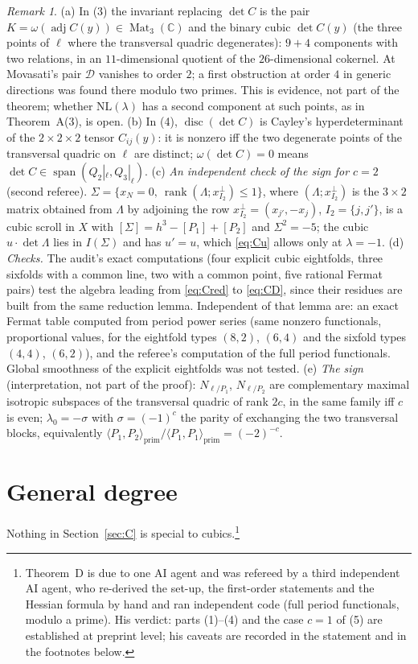 \documentclass[10pt]{article}
\numberwithin{equation}{section}
\theoremstyle{remark}
\newtheorem{remark}[theorem]{Remark}
\newcommand{\CC}{\mathbb{C}}
\newcommand{\NL}{\mathrm{NL}}
\newcommand{\cD}{\mathcal{D}}
\newcommand{\adj}{\operatorname{adj}}
\begin{document}
\begin{remark}\label{rem:C}
(a) In (3) the invariant replacing $\det C$ is the pair $K=\omega(\adj C(y))\in\operatorname{Mat}_3(\CC)$ and
the binary cubic $\det C(y)$ (the three points of $\ell$ where the transversal quadric degenerates): $9+4$
components with two relations, in an $11$-dimensional quotient of the $26$-dimensional cokernel. At Movasati's
pair $\cD$ vanishes to order $2$; a first obstruction at order $4$ in generic directions was found there modulo
two primes. This is evidence, not part of the theorem; whether $\NL(\lambda)$ has a second component at such
points, as in Theorem~A(3), is open.
(b) In (4), $\operatorname{disc}(\det C)$ is Cayley's hyperdeterminant of the $2\times2\times2$ tensor
$C_{ij}(y)$: it is nonzero iff the two degenerate points of the transversal quadric on $\ell$ are distinct;
$\omega(\det C)=0$ means $\det C\in\operatorname{span}(Q_2|_\ell,Q_3|_\ell)$.
(c) \emph{An independent check of the sign for $c=2$} (second referee). $\Sigma=\{x_N=0,\ \operatorname{rank}
(\Lambda;x_{I_2}^{\perp})\le1\}$, where $(\Lambda;x_{I_2}^{\perp})$ is the $3\times2$ matrix obtained from
$\Lambda$ by adjoining the row $x_{I_2}^{\perp}=(x_{j'},-x_j)$, $I_2=\{j,j'\}$, is a cubic scroll in $X$ with $[\Sigma]=h^3-[P_1]+[P_2]$ and $\Sigma^2=-5$; the
cubic $u\cdot\det\Lambda$ lies in $I(\Sigma)$ and has $u'=u$, which \eqref{eq:Cu} allows only at $\lambda=-1$.
(d) \emph{Checks.} The audit's exact computations (four explicit cubic eightfolds, three sixfolds with a common
line, two with a common point, five rational Fermat pairs) test the algebra leading from \eqref{eq:Cred} to
\eqref{eq:CD}, since their residues are built from the same reduction lemma. Independent of that lemma are: an
exact Fermat table computed from period power series (same nonzero functionals, proportional values, for the
eightfold types $(8,2)$, $(6,4)$ and the sixfold types $(4,4)$, $(6,2)$), and the referee's computation of the
full period functionals. Global smoothness of the explicit eightfolds was not tested.
(e) \emph{The sign} (interpretation, not part of the proof): $N_{\ell/P_1}$, $N_{\ell/P_2}$ are complementary
maximal isotropic subspaces of the transversal quadric of rank $2c$, in the same family iff $c$ is even;
$\lambda_0=-\sigma$ with $\sigma=(-1)^c$ the parity of exchanging the two transversal blocks, equivalently
$\langle P_1,P_2\rangle_{\mathrm{prim}}/\langle P_1,P_1\rangle_{\mathrm{prim}}=(-2)^{-c}$.
\end{remark}

\section{General degree}\label{sec:D}
Nothing in Section~\ref{sec:C} is special to cubics.\footnote{Theorem~D is due to one AI agent and was refereed
by a third independent AI agent, who re-derived the set-up, the first-order statements and the Hessian formula
by hand and ran independent code (full period functionals, modulo a prime). His verdict: parts (1)--(4) and the
case $c=1$ of (5) are established at preprint level; his caveats are recorded in the statement and in the
footnotes below.}
\end{document}
